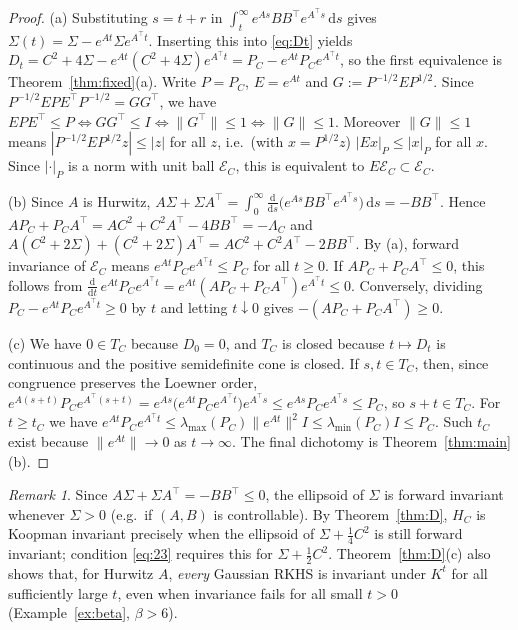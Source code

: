 \documentclass[11pt]{amsart}
\numberwithin{equation}{section}
\theoremstyle{definition}
\theoremstyle{remark}
\newtheorem{remark}[theorem]{Remark}
\newcommand{\dd}{\,\mathrm{d}}
\newcommand{\tp}{\top}
\begin{document}
\begin{proof}
(a) Substituting $s=t+r$ in $\int_t^\infty e^{As}BB^\tp e^{A^\tp s}\dd s$ gives $\Sigma(t)=\Sigma-e^{At}\Sigma e^{A^\tp t}$.
Inserting this into \eqref{eq:Dt} yields $D_t=C^2+4\Sigma-e^{At}(C^2+4\Sigma)e^{A^\tp t}=P_C-e^{At}P_Ce^{A^\tp t}$, so the
first equivalence is Theorem~\ref{thm:fixed}(a). Write $P=P_C$, $E=e^{At}$ and $G:=P^{-1/2}EP^{1/2}$. Since
$P^{-1/2}EPE^\tp P^{-1/2}=GG^\tp$, we have $EPE^\tp\le P\iff GG^\tp\le I\iff\|G^\tp\|\le1\iff\|G\|\le1$. Moreover
$\|G\|\le1$ means $|P^{-1/2}EP^{1/2}z|\le|z|$ for all $z$, i.e.\ (with $x=P^{1/2}z$) $|Ex|_{P}\le|x|_{P}$ for all $x$.
Since $|\cdot|_P$ is a norm with unit ball $\mathcal E_C$, this is equivalent to $E\mathcal E_C\subset\mathcal E_C$.

(b) Since $A$ is Hurwitz, $A\Sigma+\Sigma A^\tp=\int_0^\infty\frac{\mathrm d}{\mathrm ds}\bigl(e^{As}BB^\tp e^{A^\tp s}\bigr)\dd s=-BB^\tp$.
Hence $AP_C+P_CA^\tp=AC^2+C^2A^\tp-4BB^\tp=-\Lambda_C$ and
$A(C^2+2\Sigma)+(C^2+2\Sigma)A^\tp=AC^2+C^2A^\tp-2BB^\tp$. By (a), forward invariance of $\mathcal E_C$ means
$e^{At}P_Ce^{A^\tp t}\le P_C$ for all $t\ge0$. If $AP_C+P_CA^\tp\le0$, this follows from
$\frac{\mathrm d}{\mathrm dt}\,e^{At}P_Ce^{A^\tp t}=e^{At}(AP_C+P_CA^\tp)e^{A^\tp t}\le0$. Conversely, dividing
$P_C-e^{At}P_Ce^{A^\tp t}\ge0$ by $t$ and letting $t\downarrow0$ gives $-(AP_C+P_CA^\tp)\ge0$.

(c) We have $0\in T_C$ because $D_0=0$, and $T_C$ is closed because $t\mapsto D_t$ is continuous and the positive
semidefinite cone is closed. If $s,t\in T_C$, then, since congruence preserves the Loewner order,
$e^{A(s+t)}P_Ce^{A^\tp(s+t)}=e^{As}\bigl(e^{At}P_Ce^{A^\tp t}\bigr)e^{A^\tp s}\le e^{As}P_Ce^{A^\tp s}\le P_C$, so $s+t\in T_C$.
For $t\ge t_C$ we have $e^{At}P_Ce^{A^\tp t}\le\lambda_{\max}(P_C)\|e^{At}\|^2I\le\lambda_{\min}(P_C)I\le P_C$. Such $t_C$
exist because $\|e^{At}\|\to0$ as $t\to\infty$. The final dichotomy is Theorem~\ref{thm:main}(b).
\end{proof}

\begin{remark}
Since $A\Sigma+\Sigma A^\tp=-BB^\tp\le0$, the ellipsoid of $\Sigma$ is forward invariant whenever $\Sigma>0$
(e.g.\ if $(A,B)$ is controllable). By
Theorem~\ref{thm:D}, $H_C$ is Koopman invariant precisely when the ellipsoid of $\Sigma+\frac14C^2$ is still forward
invariant; condition \eqref{eq:23} requires this for $\Sigma+\frac12C^2$. Theorem~\ref{thm:D}(c) also shows that, for
Hurwitz $A$, \emph{every} Gaussian RKHS is invariant under $K^t$ for all sufficiently large $t$, even when invariance
fails for all small $t>0$ (Example~\ref{ex:beta}, $\beta>6$).
\end{remark}
\end{document}
